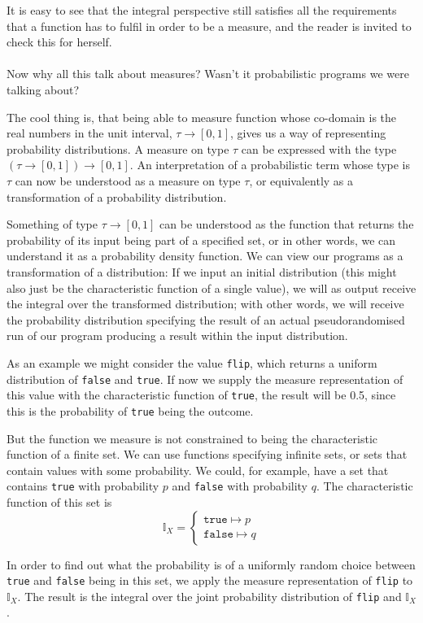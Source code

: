 \documentclass[11pt, leqno, titlepage]{article}
\theoremstyle{definition}
\begin{document}
It is easy to see that the integral perspective still satisfies all the requirements
that a function has to fulfil in order to be a measure, and the reader is invited to
check this for herself.\\
\\
Now why all this talk about measures? Wasn't it probabilistic programs we were
talking about?

The cool thing is, that being able to measure function whose co-domain is the real
numbers in the unit interval, $\tau\to[0,1]$, gives us a way of representing
probability distributions. A measure on type $\tau$ can be expressed with the type
$(\tau\to[0,1])\to[0,1]$. An interpretation of a probabilistic term whose type is
$\tau$ can now be understood as a measure on type $\tau$, or equivalently as a
transformation of a probability distribution.

Something of type $\tau\to[0,1]$ can be understood as the function that returns the
probability of its input being part of a specified set, or in other words, we can
understand it as a probability density function. We can view our programs as a
transformation of a distribution: If we input an initial distribution (this might
also just be the characteristic function of a single value), we will as output
receive the integral over the transformed distribution; with other words, we will
receive the probability distribution specifying the result of an actual
pseudorandomised run of our program producing a result within the input distribution.

As an example we might consider the value \texttt{flip}, which returns a uniform
distribution of \texttt{false} and \texttt{true}. If now we supply the measure
representation of this value with the characteristic function of \texttt{true}, the
result will be 0.5, since this is the probability of \texttt{true} being the
outcome.

But the function we measure is not constrained to being the characteristic function
of a finite set. We can use functions specifying infinite sets, or sets that contain
values with some probability. 
We could, for example, have a set that contains \texttt{true} with
probability $p$ and \texttt{false} with probability $q$.
The characteristic function of this set is
$$\mathbb{I}_X =
\begin{cases}
  \texttt{true} \mapsto p\\
  \texttt{false} \mapsto q
\end{cases}$$
 
In order to find out what the probability is of a uniformly random choice between
\texttt{true} and \texttt{false} being in this set, we apply the measure
representation of \texttt{flip} to $\mathbb{I}_X$. The result is the integral over
the joint probability distribution of \texttt{flip} and $\mathbb{I}_X$. 
\end{document}
